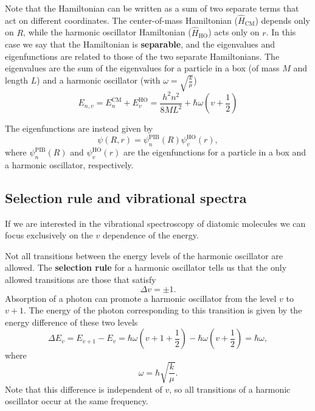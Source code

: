 \documentclass[../Main/chem331-notes.tex]{subfiles}
\begin{document}
Note that the Hamiltonian can be written as a sum of two separate terms that act on different coordinates.
The center-of-mass Hamiltonian ($\hat{H}_\mathrm{CM}$) depends only on $R$, while the harmonic oscillator Hamiltonian ($\hat{H}_\mathrm{HO}$) acts only on $r$.
In this case we say that the Hamiltonian is \textbf{separable}, and the eigenvalues and eigenfunctions are related to those of the two separate Hamiltonians.
The eigenvalues are the sum of the eigenvalues for a particle in a box (of mass $M$ and length $L$) and a harmonic oscillator (with $\omega = \sqrt{\frac{k}{\mu}}$)
\begin{equation}
E_{n,v} = E_{n}^\mathrm{CM} +  E_{v}^\mathrm{HO} = \frac{h^2 n^2}{8 M L^2} +  \hbar \omega \left( v + \frac{1}{2}\right)
\end{equation}

The eigenfunctions are instead given by
\begin{equation}
\psi(R,r) = \psi^\mathrm{PIB}_n(R) \psi^\mathrm{HO}_v(r),
\end{equation}
where $\psi^\mathrm{PIB}_n(R)$ and $\psi^\mathrm{HO}_v(r)$ are the eigenfunctions for a particle in a box and a harmonic oscillator, respectively.

\subsection{Selection rule and vibrational spectra}
If we are interested in the vibrational spectroscopy of diatomic molecules we can focus exclusively on the $v$ dependence of the energy.

Not all transitions between the energy levels of the harmonic oscillator are allowed. The \textbf{selection rule} for a harmonic oscillator tells us that the only allowed transitions are those that satisfy
\begin{equation}
\Delta v = \pm 1.
\end{equation}
Absorption of a photon can promote a harmonic oscillator from the level $v$ to $v+1$. The energy of the photon corresponding to this transition is given by the energy difference of these two levels
\begin{equation}
\Delta E_{v}= E_{v+1} - E_{v} =\hbar \omega \left( v + 1 + \frac{1}{2}\right) - \hbar \omega \left( v + \frac{1}{2}\right)
= \hbar \omega,
\end{equation}
where
\begin{equation}
\omega = \hbar \sqrt{\frac{k}{\mu}}.
\end{equation}
Note that this difference is independent of $v$, so all transitions of a harmonic oscillator occur at the same frequency.
\end{document}
